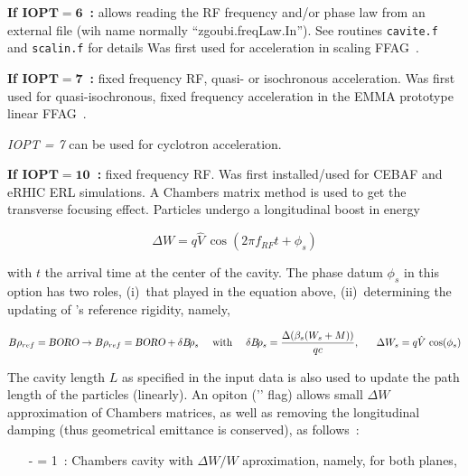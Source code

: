 {\noindent\textbf{If $\mathbf{IOPT  =  6}$~:}  
allows reading the RF frequency and/or phase law from an external file (wih name normally ``zgoubi.freqLaw.In''). 
See routines \texttt{cavite.f} and \texttt{scalin.f} for details
Was first used for  acceleration  in scaling FFAG~\cite{reportNIMFFAGSPI}.   


\bigskip

\noindent\textbf{If $\mathbf{IOPT  =  7}$~:} fixed frequency RF, quasi- or isochronous acceleration. Was 
first used for quasi-isochronous, fixed frequency acceleration in the EMMA prototype 
linear FFAG~\cite{repDapniaEMMA,EMMAIPAC10}. 

\noindent \textsl{IOPT  =  7} can be used for  cyclotron  acceleration. 


\bigskip


\noindent\textbf{If $\mathbf{IOPT  =  10}$~:} fixed frequency RF. Was 
first installed/used for CEBAF and eRHIC ERL simulations. A Chambers matrix method is used to 
get the transverse focusing effect. Particles undergo a longitudinal boost in energy

$$ \Delta W = q\hat  V\, \cos (2\pi f_{RF} t + \phi_ s) $$

\noindent with $t$ the arrival time at the center of the cavity. The phase datum $\phi_s$ in this option \textsl{}  has two roles, 
(i)~that played in the equation above, (ii)~determining the updating of \zgou's reference rigidity, namely, 

\begin{equation}
B\rho_{ref} = \BORO \rightarrow B\rho_{ref} = \BORO + \delta \Br_s  ~ ~ ~ ~ \textrm{with} ~ ~ ~ ~ \delta \Br_s= \frac{\Delta(\beta_s (W_s+M)) }{qc}, ~ ~ ~ ~ ~ \Delta W_s = q\hat  V\, \cos (\phi_ s)
\index{BORO@{\BORO}$\times D_{ref}$|textbf} \index{BORORef@$B\rho_{ref}$}
\end{equation}

\medskip

\noindent The cavity length $L$ as specified in the input data  is also used  to  update the path length 
of the particles (linearly). An opiton ('' flag) allows small $\Delta W$ approximation of Chambers matrices, as 
well as removing the longitudinal damping (thus geometrical emittance is conserved), as follows~: 
\begin{itemize}
\item[-]  = 1~:  Chambers cavity with  $\Delta W/W$ aproximation,  namely, for both planes, 


\end{itemize}}
